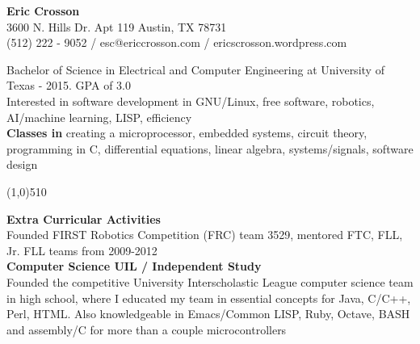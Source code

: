 \documentclass{report}
\newcommand{\cut}{\begin{center} \line(1,0){510} \end{center}}
\begin{document}
\pagestyle{empty}
\setlength\parindent{0pt}

\begin{center}
  \textbf{Eric Crosson} \\
  3600 N. Hills Dr. Apt 119 Austin, TX 78731 \\
  (512) 222 - 9052 / esc@ericcrosson.com / ericscrosson.wordpress.com\\
\end{center}


Bachelor of Science in Electrical and Computer Engineering at
University of Texas - 2015. GPA of 3.0 \\
Interested in software development in GNU/Linux, free software, robotics,
AI/machine learning, LISP, efficiency \\

\textbf{Classes in}
creating a microprocessor, embedded systems, circuit theory,
programming in C, differential equations, linear algebra, systems/signals, software design

\cut{}

\textbf{Extra Curricular Activities} \\
Founded FIRST Robotics Competition (FRC) team 3529, mentored
FTC, FLL, Jr. FLL teams from 2009-2012 \\

\textbf{Computer Science UIL / Independent Study} \\
Founded the competitive University Interscholastic League computer
science team in high school, where I educated my team in essential
concepts for Java, C/C++, Perl, HTML. Also knowledgeable in
Emacs/Common LISP, Ruby, Octave, BASH and assembly/C for
more than a couple microcontrollers \\
\end{document}
